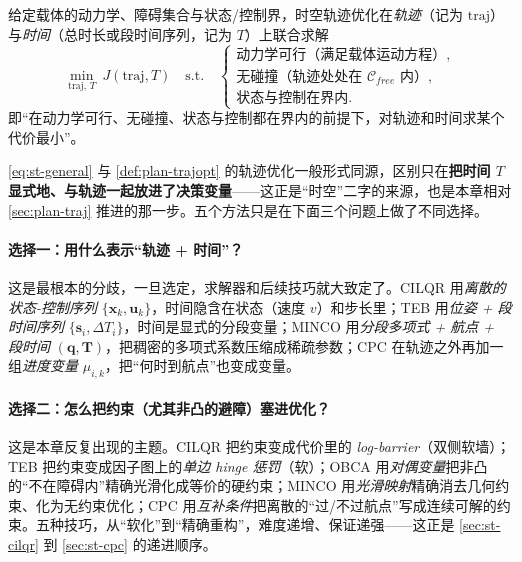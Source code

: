 \begin{definition}[时空轨迹优化的一般形式]\label{def:st-general}
给定载体的动力学、障碍集合与状态/控制界，时空轨迹优化在\emph{轨迹}（记为 $\mathrm{traj}$）与\emph{时间}（总时长或段时间序列，记为 $T$）上联合求解
\begin{equation}
  \min_{\mathrm{traj},\,T}\ J(\mathrm{traj},T)
  \quad\text{s.t.}\quad
  \begin{cases}
    \text{动力学可行（满足载体运动方程）},\\
    \text{无碰撞（轨迹处处在 } \mathcal C_{free}\text{ 内）},\\
    \text{状态与控制在界内}.
  \end{cases}
  \label{eq:st-general}
\end{equation}
即“在动力学可行、无碰撞、状态与控制都在界内的前提下，对轨迹和时间求某个代价最小”。
\end{definition}

\noindent\cref{eq:st-general} 与 \cref{def:plan-trajopt} 的轨迹优化一般形式同源，区别只在\textbf{把时间 $T$ 显式地、与轨迹一起放进了决策变量}——这正是“时空”二字的来源，也是本章相对 \cref{sec:plan-traj} 推进的那一步。五个方法只是在下面三个问题上做了不同选择。

\paragraph{选择一：用什么表示“轨迹 + 时间”？}
这是最根本的分歧，一旦选定，求解器和后续技巧就大致定了。CILQR 用\emph{离散的状态-控制序列} $\{\mathbf x_k,\mathbf u_k\}$，时间隐含在状态（速度 $v$）和步长里；TEB 用\emph{位姿 + 段时间序列} $\{\mathbf s_i,\Delta T_i\}$，时间是显式的分段变量；MINCO 用\emph{分段多项式 + 航点 + 段时间} $(\mathbf q,\mathbf T)$，把稠密的多项式系数压缩成稀疏参数；CPC 在轨迹之外再加一组\emph{进度变量} $\mu_{i,k}$，把“何时到航点”也变成变量。

\paragraph{选择二：怎么把约束（尤其非凸的避障）塞进优化？}
这是本章反复出现的主题。CILQR 把约束变成代价里的 \emph{log-barrier}（双侧软墙）；TEB 把约束变成因子图上的\emph{单边 hinge 惩罚}（软）；OBCA 用\emph{对偶变量}把非凸的“不在障碍内”精确光滑化成等价的硬约束；MINCO 用\emph{光滑映射}精确消去几何约束、化为无约束优化；CPC 用\emph{互补条件}把离散的“过/不过航点”写成连续可解的约束。五种技巧，从“软化”到“精确重构”，难度递增、保证递强——这正是 \cref{sec:st-cilqr} 到 \cref{sec:st-cpc} 的递进顺序。

